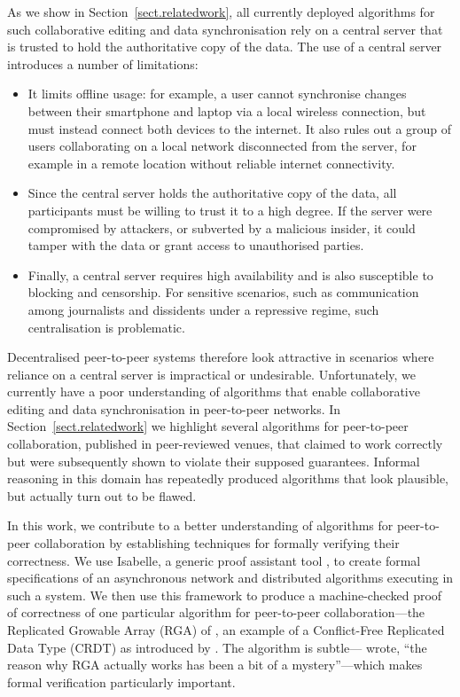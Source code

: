 \documentclass[acmlarge,review,anonymous]{acmart}\settopmatter{printfolios=true}
\begin{document}
As we show in Section~\ref{sect.relatedwork}, all currently deployed algorithms for such
collaborative editing and data synchronisation rely on a central server that is trusted to hold the
authoritative copy of the data. The use of a central server introduces a number of limitations:
\begin{itemize}
\item It limits offline usage: for example, a user cannot synchronise changes between their
    smartphone and laptop via a local wireless connection, but must instead connect both devices to
    the internet. It also rules out a group of users collaborating on a local network disconnected
    from the server, for example in a remote location without reliable internet connectivity.
\item Since the central server holds the authoritative copy of the data, all participants must be
    willing to trust it to a high degree. If the server were compromised by attackers, or subverted
    by a malicious insider, it could tamper with the data or grant access to unauthorised parties.
\item Finally, a central server requires high availability and is also susceptible to blocking and
    censorship. For sensitive scenarios, such as communication among journalists and dissidents
    under a repressive regime, such centralisation is problematic.
\end{itemize}

Decentralised peer-to-peer systems therefore look attractive in scenarios where reliance on a
central server is impractical or undesirable. Unfortunately, we currently have a poor understanding
of algorithms that enable collaborative editing and data synchronisation in peer-to-peer networks.
In Section~\ref{sect.relatedwork} we highlight several algorithms for peer-to-peer collaboration,
published in peer-reviewed venues, that claimed to work correctly but were subsequently shown to violate
their supposed guarantees. Informal reasoning in this domain has repeatedly produced algorithms that
look plausible, but actually turn out to be flawed.

In this work, we contribute to a better understanding of algorithms for peer-to-peer collaboration
by establishing techniques for formally verifying their correctness. We use Isabelle, a generic
proof assistant tool \cite{DBLP:conf/tphol/WenzelPN08}, to create formal specifications of an
asynchronous network and distributed algorithms executing in such a system. We then use this
framework to produce a machine-checked proof of correctness of one particular algorithm for
peer-to-peer collaboration---the Replicated Growable Array (RGA) of \citet{Roh:2011dw}, an example
of a Conflict-Free Replicated Data Type (CRDT) as introduced by
\citet{Shapiro:2011wy,Shapiro:2011un}.
The algorithm is subtle---\citet{Attiya:2016kh} wrote, ``the reason why RGA actually works has been
a bit of a mystery''---which makes formal verification particularly important.
\end{document}
